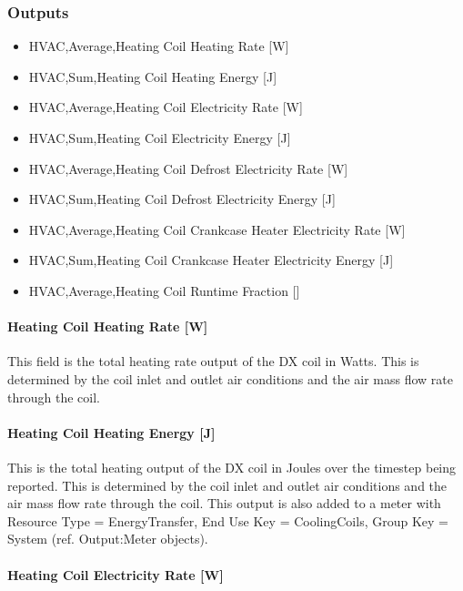 \subsubsection{Outputs}\label{outputs-15-000}

\begin{itemize}
\item
  HVAC,Average,Heating Coil Heating Rate {[}W{]}
\item
  HVAC,Sum,Heating Coil Heating Energy {[}J{]}
\item
  HVAC,Average,Heating Coil Electricity Rate {[}W{]}
\item
  HVAC,Sum,Heating Coil Electricity Energy {[}J{]}
\item
  HVAC,Average,Heating Coil Defrost Electricity Rate {[}W{]}
\item
  HVAC,Sum,Heating Coil Defrost Electricity Energy {[}J{]}
\item
  HVAC,Average,Heating Coil Crankcase Heater Electricity Rate {[}W{]}
\item
  HVAC,Sum,Heating Coil Crankcase Heater Electricity Energy {[}J{]}
\item
  HVAC,Average,Heating Coil Runtime Fraction {[]}
\end{itemize}

\paragraph{Heating Coil Heating Rate {[}W{]}}\label{heating-coil-heating-rate-w-7}

This field is the total heating rate output of the DX coil in Watts. This is determined by the coil inlet and outlet air conditions and the air mass flow rate through the coil.

\paragraph{Heating Coil Heating Energy {[}J{]}}\label{heating-coil-heating-energy-j-7}

This is the total heating output of the DX coil in Joules over the timestep being reported. This is determined by the coil inlet and outlet air conditions and the air mass flow rate through the coil. This output is also added to a meter with Resource Type = EnergyTransfer, End Use Key = CoolingCoils, Group Key = System (ref. Output:Meter objects).

\paragraph{Heating Coil Electricity Rate {[}W{]}}\label{heating-coil-electric-power-w-5}

